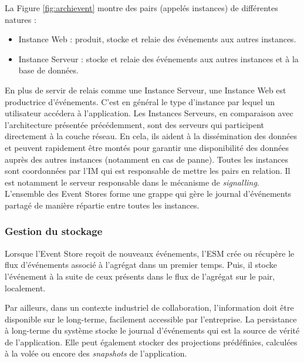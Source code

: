 La Figure \ref{fig:archievent} montre des pairs (appelés instances) de différentes 
natures :
\begin{itemize}
	\item Instance Web :  produit, stocke et relaie des événements aux autres 
	instances.
	\item Instance Serveur : stocke et relaie des événements aux autres instances 
	et à la base de données. 
\end{itemize}

En plus de servir de relais comme une Instance Serveur, une Instance Web est 
productrice d'événements. C'est en général le type d'instance par lequel un 
utilisateur accédera à l'application. Les Instances Serveurs, en comparaison avec 
l'architecture présentée précédemment, sont des \og serveurs\fg{} qui participent 
directement à la couche réseau. En cela, ils aident à la dissémination des données 
et peuvent rapidement être montés pour garantir une disponibilité des données 
auprès des autres instances (notamment en cas de panne).
Toutes les instances sont coordonnées par l'\gls{IM} qui est responsable de mettre 
les pairs en relation. Il est notamment le serveur responsable dans le mécanisme 
de \textit{signalling}. 
L'ensemble des Event Stores forme une grappe qui gère le 
journal d'événements partagé de manière répartie entre toutes les instances.
\subsubsection{Gestion du stockage}

Lorsque l'Event Store reçoit de nouveaux événements, l'\gls{ESM} crée ou 
récupère le flux d'événements associé à l'agrégat dans un premier temps. Puis, il 
stocke l'événement à la suite de ceux présents dans le flux de l'agrégat sur le pair, 
localement.


Par ailleurs, dans un contexte industriel de collaboration, l'information doit être 
disponible sur le long-terme, facilement accessible par l'entreprise. 
La persistance à long-terme du système stocke le journal d'événements qui est la 
source de vérité de l'application. Elle peut également stocker des projections 
prédéfinies, calculées à la volée ou encore des \textit{snapshots} de l'application.

